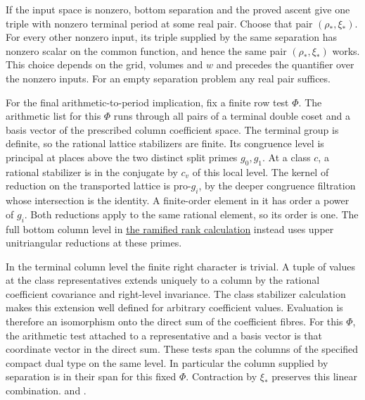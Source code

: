 If the input space is nonzero, bottom separation and the
proved ascent give one triple with nonzero terminal period
at some real pair. Choose that pair \((\rho_*,\xi_*)\).
For every other nonzero input, its triple supplied by the
same separation has nonzero scalar on the common function,
and hence the same pair \((\rho_*,\xi_*)\) works. This
choice depends on the grid, volumes and \(w\) and precedes
the quantifier over the nonzero inputs. For an empty
separation problem any real pair suffices.

For the final arithmetic-to-period implication, fix a finite row
test \(\Phi\). The arithmetic list for this \(\Phi\) runs through
all pairs of a terminal double coset and a basis vector of the
prescribed column coefficient space. The terminal group is definite,
so the rational lattice stabilizers are finite. Its congruence
level is principal at places above the two distinct split primes
\(g_0,g_1\). At a class \(c\), a rational stabilizer is in the conjugate
by \(c_v\) of this local level. The kernel of reduction on the transported
lattice is pro-\(g_i\), by the deeper congruence filtration whose
intersection is the identity. A finite-order element in it has order
a power of \(g_i\). Both reductions apply to the same rational element,
so its order is one. The full bottom column level in
\hyperlink{proof.ramified-column-loss}{the ramified rank calculation}
instead uses upper unitriangular reductions at these primes.

In the terminal column level the finite right character is
trivial. A tuple of values at the class representatives extends
uniquely to a column by the rational coefficient covariance and
right-level invariance. The class stabilizer calculation makes
this extension well defined for arbitrary coefficient values.
Evaluation is therefore an isomorphism onto the direct sum of the
coefficient fibres. For this \(\Phi\), the arithmetic test attached to
a representative and a basis vector is that coordinate vector in the
direct sum. These tests span the columns of the specified compact dual
type on the same level. In particular the
column supplied by separation is in their span for this fixed
\(\Phi\). Contraction by \(\xi_*\) preserves this linear combination.
 and
.

